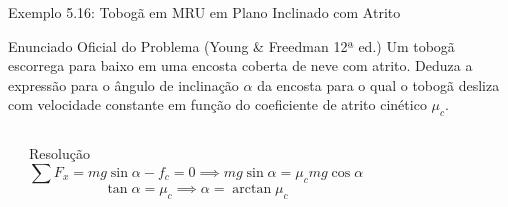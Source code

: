 \documentclass[10pt,aspectratio=169]{beamer}
\begin{document}
\begin{frame}{Exemplo 5.16: Tobogã em MRU em Plano Inclinado com Atrito}
    \begin{block}{Enunciado Oficial do Problema (Young \& Freedman 12ª ed.)}
        \small
        Um tobogã escorrega para baixo em uma encosta coberta de neve com atrito. Deduza a expressão para o ângulo de inclinação $\alpha$ da encosta para o qual o tobogã desliza com velocidade constante em função do coeficiente de atrito cinético $\mu_c$.
    \end{block}
    \begin{columns}[T]
        \begin{center}
        \end{center}
        \begin{exampleblock}{Resolução}
            \small
            $$\sum F_x = mg \sin\alpha - f_c = 0 \implies mg \sin\alpha = \mu_c mg \cos\alpha$$
            $$\tan\alpha = \mu_c \implies \alpha = \arctan\mu_c$$
        \end{exampleblock}
    \end{columns}
\end{frame}
\end{document}
